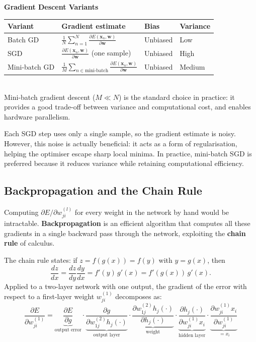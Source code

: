 \documentclass[11pt,a4paper]{article}
\newcommand{\term}[1]{\textcolor{DefGreen}{\textbf{#1}}\index{#1}}
\begin{document}
\begin{tcolorbox}[colback=LightBlue,colframe=AccentBlue,boxrule=0.8pt,arc=3pt]
\textbf{Gradient Descent Variants}\\[6pt]
\begin{tabular}{@{}llll@{}}
\toprule
\textbf{Variant} & \textbf{Gradient estimate} & \textbf{Bias} & \textbf{Variance} \\
\midrule
Batch GD & $\frac{1}{N}\sum_{n=1}^N \frac{\partial E(\mathbf{x}_n,\mathbf{w})}{\partial \mathbf{w}}$ & Unbiased & Low \\
SGD & $\frac{\partial E(\mathbf{x}_n,\mathbf{w})}{\partial \mathbf{w}}$ (one sample) & Unbiased & High \\
Mini-batch GD & $\frac{1}{M}\sum_{n \in \text{mini-batch}} \frac{\partial E(\mathbf{x}_n,\mathbf{w})}{\partial \mathbf{w}}$ & Unbiased & Medium \\
\bottomrule
\end{tabular}\\[6pt]
Mini-batch gradient descent ($M \ll N$) is the standard choice in practice: it provides a good trade-off between variance and computational cost, and enables hardware parallelism.
\end{tcolorbox}

\begin{insightbox}
Each SGD step uses only a single sample, so the gradient estimate is noisy. However, this noise is actually beneficial: it acts as a form of regularisation, helping the optimiser escape sharp local minima. In practice, mini-batch SGD is preferred because it reduces variance while retaining computational efficiency.
\end{insightbox}

\subsection{Backpropagation and the Chain Rule}

Computing $\partial E / \partial w_{ji}^{(l)}$ for every weight in the network by hand would be intractable. \term{Backpropagation} is an efficient algorithm that computes all these gradients in a single backward pass through the network, exploiting the \term{chain rule} of calculus.

The chain rule states: if $z = f(g(x)) = f(y)$ with $y = g(x)$, then
\[
\frac{dz}{dx} = \frac{dz}{dy}\frac{dy}{dx} = f'(y)\,g'(x) = f'(g(x))\,g'(x).
\]
Applied to a two-layer network with one output, the gradient of the error with respect to a first-layer weight $w_{ji}^{(1)}$ decomposes as:
\[
\frac{\partial E}{\partial w_{ji}^{(1)}} = \underbrace{\frac{\partial E}{\partial g}}_{\text{output error}} \cdot \underbrace{\frac{\partial g}{\partial w_{1j}^{(2)} h_j(\cdot)}}_{\text{output layer}} \cdot \underbrace{\frac{\partial w_{1j}^{(2)} h_j(\cdot)}{\partial h_j(\cdot)}}_{\text{weight}} \cdot \underbrace{\frac{\partial h_j(\cdot)}{\partial w_{ji}^{(1)} x_i}}_{\text{hidden layer}} \cdot \underbrace{\frac{\partial w_{ji}^{(1)} x_i}{\partial w_{ji}^{(1)}}}_{\;= x_i}
\]
\end{document}
